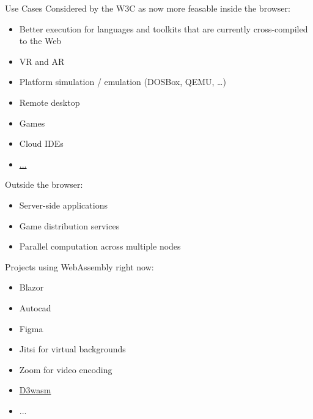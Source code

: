 \documentclass{beamer}
\begin{document}
\begin{frame}{Use Cases}
    Considered by the W3C as now more feasable inside the browser:
    \begin{itemize}
        \item Better execution for languages and toolkits that are currently cross-compiled to the Web
        \item VR and AR
        \item Platform simulation / emulation (DOSBox, QEMU, …)
        \item Remote desktop
        \item Games
        \item Cloud IDEs
        \item \href{https://webassembly.org/docs/use-cases/}{...}
    \end{itemize}
    Outside the browser:
    \begin{itemize}
        \item Server-side applications
        \item Game distribution services
        \item Parallel computation across multiple nodes
    \end{itemize}
\end{frame}

\begin{frame}
    Projects using WebAssembly right now: 
    \begin{itemize}
        \item Blazor
        \item Autocad
        \item Figma
        \item Jitsi for virtual backgrounds
        \item Zoom for video encoding
        \item \href{https://wasm.continuation-labs.com/d3demo/}{D3wasm}
        \item ...
    \end{itemize}
\end{frame}
\end{document}

